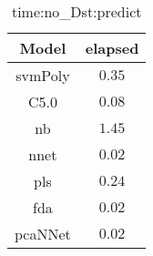 \begin{table}[!ht]
	\centering
	\begin{tabular}{|c|c|}
		\hline
		Model & elapsed \\ \hline
		svmPoly & $0.35$ \\ \hline
		C5.0 & $0.08$ \\ \hline
		nb & $1.45$ \\ \hline
		nnet & $0.02$ \\ \hline
		pls & $0.24$ \\ \hline
		fda & $0.02$ \\ \hline
		pcaNNet & $0.02$ \\ \hline
	\end{tabular}
	\caption{time:no_Dst:predict}
	\label{tab:time:no_Dst:predict}
\end{table}

